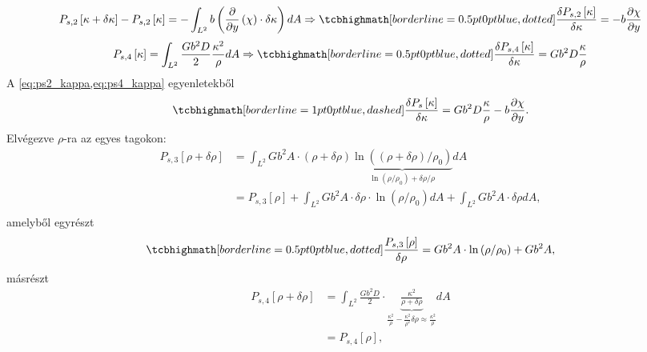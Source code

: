 \documentclass[10pt,a4paper]{scrartcl}
\begin{document}
\begin{equation} \label{eq:ps2_kappa}
{P_{s,2}}\left[ {\kappa  + \delta \kappa } \right] - {P_{s,2}}\left[ \kappa  \right] =  - \int_{{L^2}} {b\left( {\frac{\partial }{{\partial y}}\left( \chi  \right) \cdot \delta \kappa } \right)dA}  \Rightarrow \tcbhighmath[borderline={0.5pt}{0pt}{blue,dotted}]{ \frac{{\delta {P_{s,2}}\left[ \kappa  \right]}}{{\delta \kappa }} =  - b\frac{{\partial \chi }}{{\partial y}}}
\end{equation}
\begin{equation} \label{eq:ps4_kappa}
{P_{s,4}}\left[ \kappa  \right] = \int_{{L^2}} {\frac{{G{b^2}D}}{2}\frac{{{\kappa ^2}}}{\rho }dA}  \Rightarrow \tcbhighmath[borderline={0.5pt}{0pt}{blue,dotted}]{\frac{{\delta {P_{s,4}}\left[ \kappa  \right]}}{{\delta \kappa }} = G{b^2}D\frac{\kappa }{\rho }}
\end{equation}
A \cref{eq:ps2_kappa,eq:ps4_kappa} egyenletekből
\begin{equation} \label{eq:ps_kappa}
\tcbhighmath[borderline={1pt}{0pt}{blue,dashed}]{\frac{{\delta {P_s}\left[ \kappa  \right]}}{{\delta \kappa }} = G{b^2}D\frac{\kappa }{\rho } - b\frac{{\partial \chi }}{{\partial y}}.}
\end{equation}
Elvégezve $\rho$-ra az egyes tagokon:
\[\begin{aligned}
  {P_{s,3}}\left[ {\rho  + \delta \rho } \right] &  = \int_{{L^2}} {G{b^2}A \cdot \left( {\rho  + \delta \rho } \right)\underbrace {\ln \left( {\left( {\rho  + \delta \rho } \right)/{\rho _0}} \right)}_{\ln \left( {\rho /{\rho _0}} \right) + \delta \rho /\rho }} dA \\ 
   &  = {P_{s,3}}\left[ \rho  \right] + \int_{{L^2}} {G{b^2}A \cdot \delta \rho  \cdot \ln \left( {\rho /{\rho _0}} \right)} dA + \int_{{L^2}} {G{b^2}A \cdot \delta \rho } dA, \\ 
\end{aligned} \]
amelyből egyrészt
\begin{equation} \label{eq:ps3_rho}
\tcbhighmath[borderline={0.5pt}{0pt}{blue,dotted}]{\frac{{{P_{s,3}}\left[ \rho  \right]}}{{\delta \rho }} = G{b^2}A \cdot \ln \left( {\rho /{\rho _0}} \right) + G{b^2}A,}
\end{equation}
másrészt
\[\begin{aligned}
  {P_{s,4}}\left[ {\rho  + \delta \rho } \right] &  = \int_{{L^2}} {\frac{{G{b^2}D}}{2} \cdot \underbrace {\frac{{{\kappa ^2}}}{{\rho  + \delta \rho }}}_{\frac{{{\kappa ^2}}}{\rho } - \frac{{{\kappa ^2}}}{{{\rho ^2}}}\delta \rho \approx \frac{\kappa^2}{\rho }}} dA \\ 
   &  = {P_{s,4}}\left[ \rho  \right], \\ 
\end{aligned} \]
\end{document}
